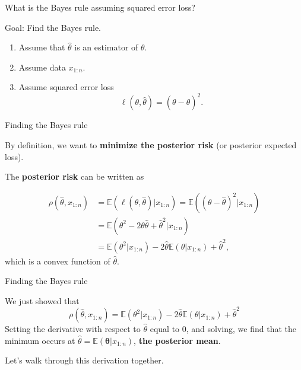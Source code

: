 \documentclass[
  ignorenonframetext,
]{beamer}
\providecommand{\tightlist}{%
  \setlength{\itemsep}{0pt}\setlength{\parskip}{0pt}}
\newcommand{\btheta}{{\bm\theta}}
\newcommand{\E}{\mathbb{E}}
\begin{document}
\begin{frame}{What is the Bayes rule assuming squared error loss?}
\protect\hypertarget{what-is-the-bayes-rule-assuming-squared-error-loss}{}

Goal: Find the Bayes rule.

\begin{enumerate}
\tightlist
\item
  Assume that \(\hat{\theta}\) is an estimator of \(\theta.\)
\item
  Assume data \(x_{1:n}.\)
\item
  Assume squared error loss
  \[\ell(\theta,\hat\theta) = (\theta-\hat\theta)^2.\]
\end{enumerate}

\end{frame}

\begin{frame}{Finding the Bayes rule}
\protect\hypertarget{finding-the-bayes-rule}{}

By definition, we want to \textbf{minimize the posterior risk} (or
posterior expected loss).

The \textbf{posterior risk} can be written as

\begin{align*}
\rho(\hat\theta,x_{1:n})&=\E(\ell(\theta,\hat\theta)|x_{1:n}) =
\E((\theta-\hat\theta)^2|x_{1:n}) \\
&= 
\E(\theta^2 - 2\theta\hat\theta + \hat\theta^2|x_{1:n})\\
&=\E(\theta^2|x_{1:n}) - 2\hat\theta\E(\theta|x_{1:n}) +\hat\theta^2,
\end{align*} which is a convex function of \(\hat\theta\).

\end{frame}

\begin{frame}{Finding the Bayes rule}
\protect\hypertarget{finding-the-bayes-rule-1}{}

We just showed that
\[\rho(\hat\theta,x_{1:n}) = \E(\theta^2|x_{1:n}) - 2\hat\theta\E(\theta|x_{1:n}) +\hat\theta^2\]
Setting the derivative with respect to \(\hat\theta\) equal to \(0\),
and solving, we find that the minimum occurs at
\(\hat\theta = \E(\btheta|x_{1:n})\), \textbf{the posterior mean}.

Let's walk through this derivation together.

\end{frame}
\end{document}
